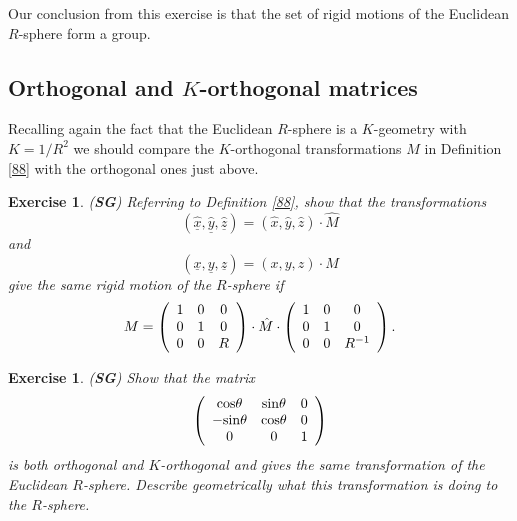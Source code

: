 \documentclass{article}%
\newtheorem{exercise}[theorem]{Exercise}
\begin{document}
Our conclusion from this exercise is that the set of rigid motions of the
Euclidean $R$-sphere form a group.\pagebreak

\subsection{Orthogonal and $K$-orthogonal matrices}

Recalling again the fact that the Euclidean $R$-sphere is a $K$-geometry with
$K=1/R^{2}$ we should compare the $K$-orthogonal transformations $M$ in
Definition \ref{88} with the orthogonal ones just above.

\begin{exercise}
(\textbf{SG}) Referring to Definition \ref{88}, show that the transformations%
\[
\left(  \underline{\hat{x}},\underline{\hat{y}},\underline{\hat{z}}\right)
=\left(  \hat{x},\hat{y},\hat{z}\right)  \cdot\hat{M}%
\]
and%
\[
\left(  \underline{x},\underline{y},\underline{z}\right)  =\left(
x,y,z\right)  \cdot M
\]
give the same rigid motion of the $R$-sphere if
\[
M=\left(
\begin{array}
[c]{ccc}%
1 & 0 & 0\\
0 & 1 & 0\\
0 & 0 & R
\end{array}
\right)  \cdot\hat{M}\cdot\left(
\begin{array}
[c]{ccc}%
1 & 0 & 0\\
0 & 1 & 0\\
0 & 0 & R^{-1}%
\end{array}
\right)  .
\]

\end{exercise}

\begin{exercise}
(\textbf{SG}) Show that the matrix%
\[
\left(
\begin{array}
[c]{ccc}%
\mathrm{cos}\theta & \mathrm{sin}\theta & 0\\
-\mathrm{sin}\theta & \mathrm{cos}\theta & 0\\
0 & 0 & 1
\end{array}
\right)
\]
is both orthogonal and $K$-orthogonal and gives the same transformation of the
Euclidean $R$-sphere. Describe geometrically what this transformation is doing
to the $R$-sphere.
\end{exercise}
\end{document}
